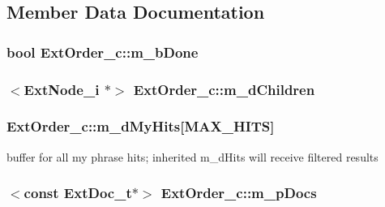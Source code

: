 \subsection{Member Data Documentation}
\hypertarget{classExtOrder__c_a89b86c70787618a25cdaf7ee7959a546}{
\subsubsection[{m\-\_\-b\-Done}]{\setlength{\rightskip}{0pt plus 5cm}bool Ext\-Order\-\_\-c\-::m\-\_\-b\-Done\hspace{0.3cm}{\ttfamily [protected]}}}\label{classExtOrder__c_a89b86c70787618a25cdaf7ee7959a546}
\hypertarget{classExtOrder__c_a773002ab4950304bc50961559fc0faa5}{
\subsubsection[{m\-\_\-d\-Children}]{$<${\bf Ext\-Node\-\_\-i} $\ast$$>$ Ext\-Order\-\_\-c\-::m\-\_\-d\-Children\hspace{0.3cm}{\ttfamily [protected]}}}\label{classExtOrder__c_a773002ab4950304bc50961559fc0faa5}
\hypertarget{classExtOrder__c_a4073b2991e5f2f0bc16ada6495aaf05d}{
\subsubsection[{m\-\_\-d\-My\-Hits}]{ Ext\-Order\-\_\-c\-::m\-\_\-d\-My\-Hits\mbox{[}{\bf M\-A\-X\-\_\-\-H\-I\-T\-S}\mbox{]}\hspace{0.3cm}{\ttfamily [protected]}}}\label{classExtOrder__c_a4073b2991e5f2f0bc16ada6495aaf05d}


buffer for all my phrase hits; inherited m\-\_\-d\-Hits will receive filtered results 

\hypertarget{classExtOrder__c_a22d81dbd92328c2e70bd7ee9d8da4444}{
\subsubsection[{m\-\_\-p\-Docs}]{$<$const {\bf Ext\-Doc\-\_\-t}$\ast$$>$ Ext\-Order\-\_\-c\-::m\-\_\-p\-Docs\hspace{0.3cm}{\ttfamily [protected]}}}\label{classExtOrder__c_a22d81dbd92328c2e70bd7ee9d8da4444}


